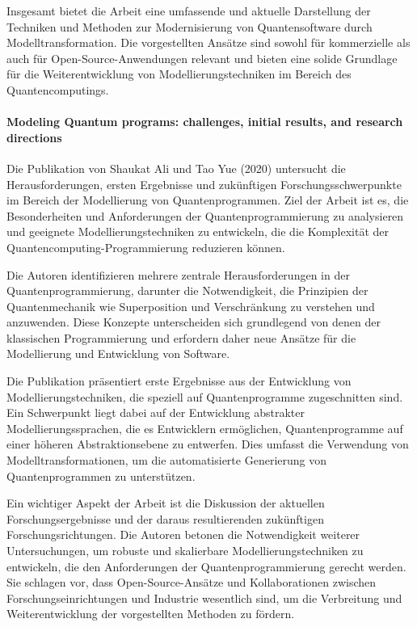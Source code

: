 Insgesamt bietet die Arbeit eine umfassende und aktuelle Darstellung der Techniken und Methoden zur Modernisierung 
von Quantensoftware durch Modelltransformation. Die vorgestellten Ansätze sind sowohl für kommerzielle als auch 
für Open-Source-Anwendungen relevant und bieten eine solide Grundlage für die Weiterentwicklung von 
Modellierungstechniken im Bereich des Quantencomputings.

\paragraph{Modeling Quantum programs: challenges, initial results, and research directions}

Die Publikation von Shaukat Ali und Tao Yue (2020) \cite{ali2020modeling} untersucht die Herausforderungen, ersten Ergebnisse und 
zukünftigen Forschungsschwerpunkte im Bereich der Modellierung von Quantenprogrammen. Ziel der Arbeit ist es, 
die Besonderheiten und Anforderungen der Quantenprogrammierung zu analysieren und geeignete Modellierungstechniken 
zu entwickeln, die die Komplexität der Quantencomputing-Programmierung reduzieren können.

Die Autoren identifizieren mehrere zentrale Herausforderungen in der Quantenprogrammierung, darunter die 
Notwendigkeit, die Prinzipien der Quantenmechanik wie Superposition und Verschränkung zu verstehen und anzuwenden. 
Diese Konzepte unterscheiden sich grundlegend von denen der klassischen Programmierung und erfordern daher neue 
Ansätze für die Modellierung und Entwicklung von Software.

Die Publikation präsentiert erste Ergebnisse aus der Entwicklung von Modellierungstechniken, die speziell auf 
Quantenprogramme zugeschnitten sind. Ein Schwerpunkt liegt dabei auf der Entwicklung abstrakter Modellierungssprachen, 
die es Entwicklern ermöglichen, Quantenprogramme auf einer höheren Abstraktionsebene zu entwerfen. Dies umfasst die 
Verwendung von Modelltransformationen, um die automatisierte Generierung von Quantenprogrammen zu unterstützen.

Ein wichtiger Aspekt der Arbeit ist die Diskussion der aktuellen Forschungsergebnisse und der daraus resultierenden 
zukünftigen Forschungsrichtungen. Die Autoren betonen die Notwendigkeit weiterer Untersuchungen, um robuste und 
skalierbare Modellierungstechniken zu entwickeln, die den Anforderungen der Quantenprogrammierung gerecht werden. 
Sie schlagen vor, dass Open-Source-Ansätze und Kollaborationen zwischen Forschungseinrichtungen und Industrie 
wesentlich sind, um die Verbreitung und Weiterentwicklung der vorgestellten Methoden zu fördern.


